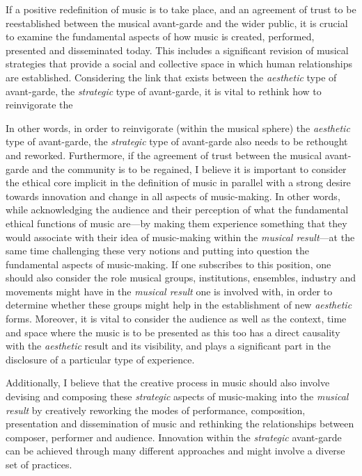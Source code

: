 If a positive redefinition of music is to take place, and an agreement of trust to be reestablished between the musical avant-garde and the wider public, it is crucial to examine the fundamental aspects of how music is created, performed, presented and disseminated today. This includes a significant revision of musical strategies that provide a social and collective space in which human relationships are established. Considering the link that exists between the \emph{aesthetic} type of avant-garde, the \emph{strategic} type of avant-garde, it is vital to rethink how to reinvigorate the 

 In other words, in order to reinvigorate (within the musical sphere) the \emph{aesthetic} type of avant-garde, the \emph{strategic} type of avant-garde also needs to be rethought and reworked. Furthermore, if the agreement of trust between the musical avant-garde and the community is to be regained, I believe it is important to consider the ethical core implicit in the definition of music in parallel with a strong desire towards innovation and change in all aspects of music-making. In other words, while acknowledging the audience and their perception of what the fundamental ethical functions of music are---by making them experience something that they would associate with their idea of music-making within the \emph{musical result}---at the same time challenging these very notions and putting into question the fundamental aspects of music-making. If one subscribes to this position, one should also consider the role musical groups, institutions, ensembles, industry and movements might have in the \emph{musical result} one is involved with, in order to determine whether these groups might help in the establishment of new \emph{aesthetic} forms. Moreover, it is vital to consider the audience as well as the context, time and space where the music is to be presented as this too has a direct causality with the \emph{aesthetic} result and its visibility, and plays a significant part in the disclosure of a particular type of experience. 

Additionally, I believe that the creative process in music should also involve devising and composing these \emph{strategic} aspects of music-making into the \emph{musical result} by creatively reworking the modes of performance, composition, presentation and dissemination of music and rethinking the relationships between composer, performer and audience. Innovation within the \emph{strategic} avant-garde can be achieved through many different approaches and might involve a diverse set of practices. 

